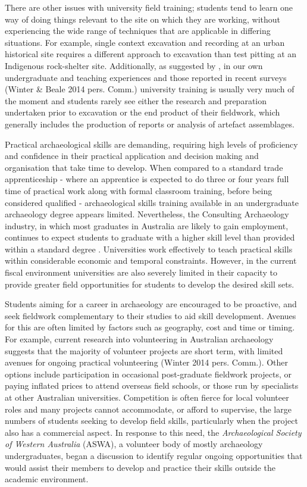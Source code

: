\documentclass[%
]{ijsra}
\begin{document}
	There are other issues with university field training; students tend to learn one way of doing things relevant to the site on which they are working, without experiencing the wide range of techniques that are applicable in differing situations. 
	For example, single context excavation and recording at an urban historical site requires a different approach to excavation than test pitting at an Indigenous rock-shelter site. 
	Additionally, as suggested by \textcite[44]{cosgrove2013}, in our own undergraduate and teaching experiences and 
	those reported in recent surveys (Winter \& Beale 2014 pers. Comm.) university training is usually very much of the moment and students rarely see either the research and preparation undertaken prior to excavation or the end product of their fieldwork, which generally includes the production of reports or analysis of artefact assemblages.
	
	Practical archaeological skills are demanding, requiring high levels of proficiency and confidence in their practical application and decision making and organisation that take time to develop. 
	When compared to a standard trade apprenticeship - where an apprentice is expected to do three or four years full time of practical work along with formal classroom training, before being considered qualified - archaeological skills training available in an undergraduate archaeology degree appears limited. 
	Nevertheless, the Consulting Archaeology industry, in which most graduates in Australia are likely to gain employment, continues to expect students to graduate with a higher skill level than provided within a standard degree \parencites{colley2004}{colley2012}{gibbs2005}. 
	Universities work effectively to teach practical skills within considerable economic and temporal constraints. However, in the current fiscal environment universities are also severely limited in their capacity to provide greater field opportunities for students to develop the desired skill sets.
	
	Students aiming for a career in archaeology are encouraged to be proactive, and seek fieldwork complementary to their studies to aid skill development. 
	Avenues for this are often limited by factors such as geography, cost and time or timing. 
	For example, current research into volunteering in Australian archaeology suggests that the majority of volunteer projects are short term, with limited avenues for ongoing practical volunteering (Winter 2014 pers. Comm.). 
	Other options include participation in occasional post-graduate fieldwork projects, or paying inflated prices to attend overseas field schools, or those run by specialists at other Australian universities. 
	Competition is often fierce for local volunteer roles and many projects cannot accommodate, or afford to supervise, the large numbers of students seeking to develop field skills, particularly when the project also has a commercial aspect. 
	In response to this need, the \emph{Archaeological Society of Western Australia} (ASWA), a volunteer body of mostly archaeology undergraduates, began a discussion to identify regular ongoing opportunities that would assist their members to develop and practice their skills outside the academic environment. 
	
\end{document}
